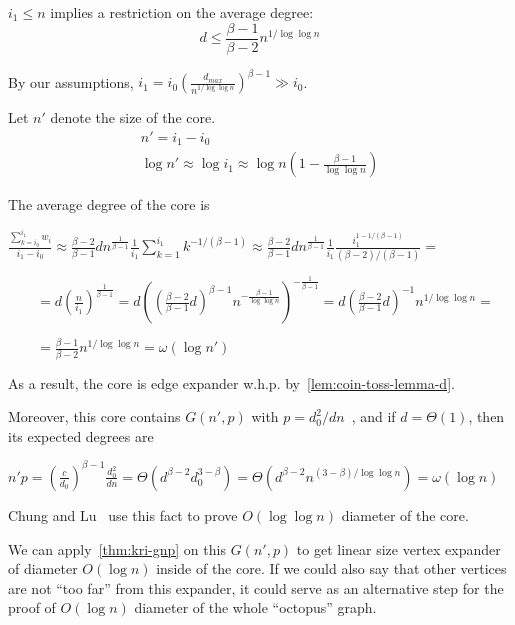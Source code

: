 $i_1\leq n$ implies a restriction on the average degree:
\begin{equation}
    d\leq\frac{\beta-1}{\beta-2}n^{1/\log\log n}
\end{equation}

By our assumptions, $i_1=i_0\left(\frac{d_{max}}{n^{1/\log\log n}}\right)^{\beta-1}\gg i_0$.

Let $n'$ denote the size of the core.
\begin{gather}
    n'=i_1-i_0\\
    \log n'\approx\log i_1\approx\log n\left(1-\frac{\beta-1}{\log\log n}\right)
\end{gather}

The average degree of the core is

$\frac{\sum_{k=i_0}^{i_1}{w_i}}{i_1-i_0}
\approx\frac{\beta-2}{\beta-1}dn^{\frac{1}{\beta-1}}\frac{1}{i_1}
\sum_{k=1}^{i_1}{k^{-1/(\beta-1)}}
\approx\frac{\beta-2}{\beta-1}dn^{\frac{1}{\beta-1}}\frac{1}{i_1}
\frac{i_1^{1-1/(\beta-1)}}{(\beta-2)/(\beta-1)}=$

$\qquad=d\left(\frac{n}{i_1}\right)^{\frac{1}{\beta-1}}
=d\left(\left(\frac{\beta-2}{\beta-1}d\right)^{\beta-1}n^{-\frac{\beta-1}{\log\log n}}\right)^{-\frac{1}{\beta-1}}
=d\left(\frac{\beta-2}{\beta-1}d\right)^{-1}n^{1/\log\log n}=$

$\qquad=\frac{\beta-1}{\beta-2}n^{1/\log\log n}=\omega(\log n')$

As a result, the core is edge expander w.h.p. by~\autoref{lem:coin-toss-lemma-d}.

Moreover, this core contains $G(n',p)$ with $p=d_0^2/dn$~\cite{cl04},
and if $d=\Theta(1)$, then its expected degrees are

$n'p=\left(\frac{c}{d_0}\right)^{\beta-1}\frac{d_0^2}{dn}
=\Theta\left(d^{\beta-2}d_0^{3-\beta}\right)
=\Theta\left(d^{\beta-2}n^{(3-\beta)/\log\log n}\right)
=\omega(\log n)$

Chung and Lu~\cite{cl04} use this fact to prove $O(\log\log n)$ diameter of the core.

We can apply~\autoref{thm:kri-gnp} on this $G(n',p)$ to get linear size
vertex expander of diameter $O(\log n)$ inside of the core.
If we could also say that other vertices are not ``too far'' from this expander,
it could serve as an alternative step for the proof
of $O(\log n)$ diameter of the whole ``octopus'' graph.

